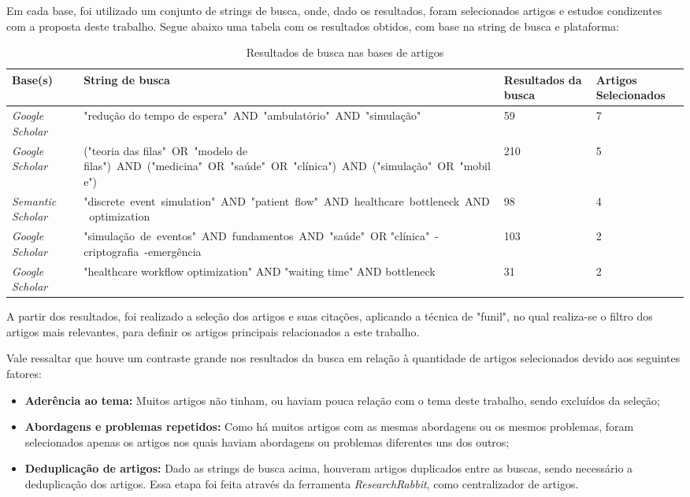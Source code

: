 \documentclass[
    12pt,                %
    openright,           %
    oneside,             %
    a4paper,             %
    english,             %
    brazil               %
]{abntex2}
\begin{document}
Em cada base, foi utilizado um conjunto de strings de busca, onde, dado os resultados, foram selecionados artigos e estudos condizentes com a proposta deste trabalho. Segue abaixo uma tabela com os resultados obtidos, com base na string de busca e plataforma:


\begin{table}[H]
	\centering
	\footnotesize
	\caption{Resultados de busca nas bases de artigos}
	\setlength{\tabcolsep}{4pt}
	\begin{tabularx}{\textwidth}{p{3cm}|p{7cm}|p{2cm}|p{2cm}}
		\toprule
		\textbf{Base(s)} & \textbf{String de busca} & \textbf{Resultados da busca} & \textbf{Artigos Selecionados} \\ 
		\midrule
		\textit{Google Scholar} & "redução do tempo de espera"\ AND\ "ambulatório"\ AND\ "simulação" & 59 & 7 \\ 
		\midrule
		\textit{Google Scholar} & ("teoria das filas"\ OR\ "modelo de filas")\ AND\ ("medicina"\ OR\ "saúde"\ OR\ "clínica")\ AND\ ("simulação"\ OR\ "mobile") & 210 & 5 \\ 
		\midrule
		\textit{Semantic Scholar} & "discrete\ event\ simulation"\ AND\ "patient\ flow"\ AND\ healthcare\ bottleneck\ AND\ optimization & 98 & 4 \\ 
		\midrule
		\textit{Google Scholar} & "simulação\ de\ eventos"\ AND\ fundamentos\ AND\ "saúde"\ OR "clínica"\ -criptografia\ -emergência & 103 & 2 \\ 
		\midrule
		\textit{Google Scholar} & "healthcare workflow optimization" AND "waiting time" AND bottleneck & 31 & 2 \\ 
		\bottomrule
	\end{tabularx}
	\label{tab:busca}
\end{table}

A partir dos resultados, foi realizado a seleção dos artigos e suas citações, aplicando a técnica de "funil", no qual realiza-se o filtro dos artigos mais relevantes, para definir os artigos principais relacionados a este trabalho.

Vale ressaltar que houve um contraste grande nos resultados da busca em relação à quantidade de artigos selecionados devido aos seguintes fatores:
\begin{itemize}
	\item \textbf{Aderência ao tema:} Muitos artigos não tinham, ou haviam pouca relação com o tema deste trabalho, sendo excluídos da seleção;
	\item \textbf{Abordagens e problemas repetidos:} Como há muitos artigos com as mesmas abordagens ou os mesmos problemas, foram selecionados apenas os artigos nos quais haviam abordagens ou problemas diferentes uns dos outros;
	\item \textbf{Deduplicação de artigos:} Dado as strings de busca acima, houveram artigos duplicados entre as buscas, sendo necessário a deduplicação dos artigos. Essa etapa foi feita através da ferramenta \textit{ResearchRabbit}, como centralizador de artigos.
\end{itemize}
\end{document}
